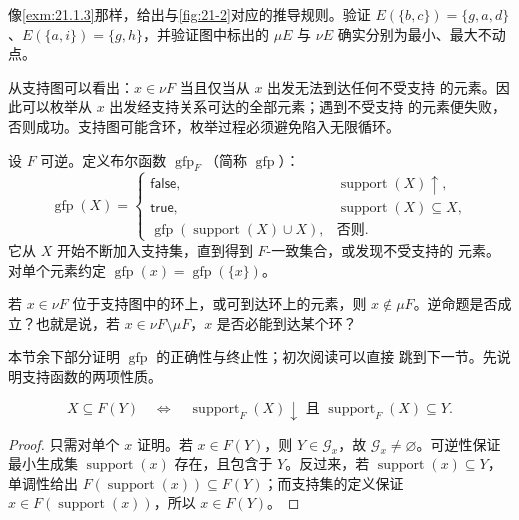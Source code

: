 \begin{exercise}[\(\star\)]
\label{ex:21.5.4}
像\cref{exm:21.1.3}那样，给出与\cref{fig:21-2}对应的推导规则。验证
\(E(\{b,c\})=\{g,a,d\}\)、\(E(\{a,i\})=\{g,h\}\)，并验证图中标出的
\(\mu E\) 与 \(\nu E\) 确实分别为最小、最大不动点。
\end{exercise}

从支持图可以看出：\(x\in\nu F\) 当且仅当从 \(x\) 出发无法到达任何不受支持
的元素。因此可以枚举从 \(x\) 出发经支持关系可达的全部元素；遇到不受支持
的元素便失败，否则成功。支持图可能含环，枚举过程必须避免陷入无限循环。

\begin{definition}
\label{def:21.5.5}
设 \(F\) 可逆。定义布尔函数 \(\operatorname{gfp}_F\)（简称
\(\operatorname{gfp}\)）：
\[
\operatorname{gfp}(X)=
\begin{cases}
\mathsf{false},&\operatorname{support}(X)\uparrow,\\
\mathsf{true},&\operatorname{support}(X)\subseteq X,\\
\operatorname{gfp}(\operatorname{support}(X)\cup X),&\text{否则}.
\end{cases}
\]
它从 \(X\) 开始不断加入支持集，直到得到 \(F\)-一致集合，或发现不受支持的
元素。
对单个元素约定 \(\operatorname{gfp}(x)=\operatorname{gfp}(\{x\})\)。
\end{definition}

\begin{exercise}[\(\star\)]
\label{ex:21.5.6}
若 \(x\in\nu F\) 位于支持图中的环上，或可到达环上的元素，则
\(x\notin\mu F\)。逆命题是否成立？也就是说，若
\(x\in\nu F\setminus\mu F\)，\(x\) 是否必能到达某个环？
\end{exercise}

本节余下部分证明 \(\operatorname{gfp}\) 的正确性与终止性；初次阅读可以直接
跳到下一节。先说明支持函数的两项性质。

\begin{lemma}
\label{lem:21.5.7}
\[
X\subseteq F(Y)\quad\Longleftrightarrow\quad
\operatorname{support}_F(X)\downarrow
\text{ 且 }\operatorname{support}_F(X)\subseteq Y.
\]
\end{lemma}

\begin{proof}
只需对单个 \(x\) 证明。若 \(x\in F(Y)\)，则 \(Y\in\mathcal G_x\)，故
\(\mathcal G_x\ne\varnothing\)。可逆性保证最小生成集
\(\operatorname{support}(x)\) 存在，且包含于 \(Y\)。反过来，若
\(\operatorname{support}(x)\subseteq Y\)，单调性给出
\(F(\operatorname{support}(x))\subseteq F(Y)\)；而支持集的定义保证
\(x\in F(\operatorname{support}(x))\)，所以 \(x\in F(Y)\)。
\end{proof}

